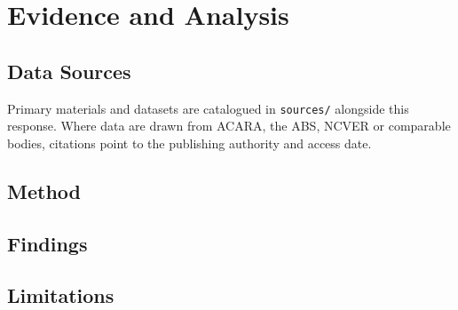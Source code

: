 \chapter{Evidence and Analysis}
\label{ch:evidence}


\section{Data Sources}
\label{sec:evidence:sources}

Primary materials and datasets are catalogued in \texttt{sources/} alongside this response. Where data are drawn from ACARA, the ABS, NCVER or comparable bodies, citations point to the publishing authority and access date.

\section{Method}
\label{sec:evidence:method}

\lipsum[1]

\section{Findings}
\label{sec:evidence:findings}

\lipsum[2-3]

\section{Limitations}
\label{sec:evidence:limitations}

\lipsum[4]
